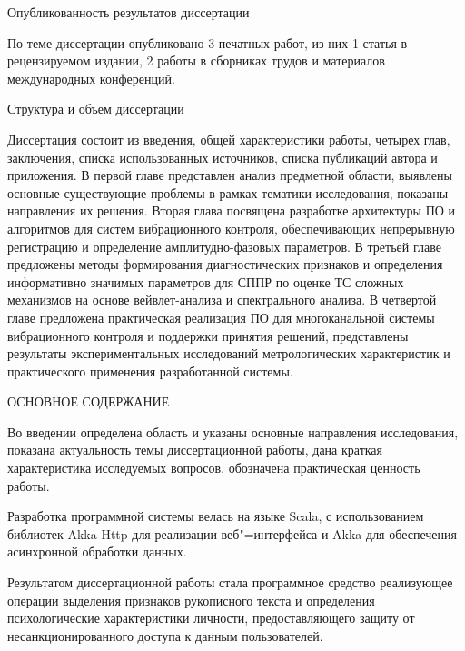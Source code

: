 



Опубликованность результатов диссертации

По теме диссертации опубликовано 3 печатных работ, из них 1 статья в рецензируемом издании, 2 работы в сборниках трудов и материалов международных конференций.

Структура и объем диссертации

Диссертация состоит из введения, общей характеристики работы, четырех глав, заключения, списка использованных источников, списка публикаций автора и приложения. В первой главе представлен анализ предметной области, выявлены основные существующие проблемы в рамках тематики исследования, показаны направления их решения. Вторая глава посвящена разработке архитектуры ПО и алгоритмов для систем вибрационного контроля, обеспечивающих непрерывную регистрацию и определение амплитудно-фазовых параметров. В третьей главе предложены методы формирования диагностических признаков и определения информативно значимых параметров для СППР по оценке ТС сложных механизмов на основе вейвлет-анализа и спектрального анализа. В четвертой главе предложена практическая реализация ПО для многоканальной системы вибрационного контроля и поддержки принятия решений, представлены результаты экспериментальных исследований метрологических характеристик и практического применения разработанной системы.


ОСНОВНОЕ СОДЕРЖАНИЕ

Во введении определена область и указаны основные направления исследования, показана актуальность темы диссертационной работы, дана краткая характеристика исследуемых вопросов, обозначена практическая ценность     работы.

Разработка программной системы велась на языке Scala, с использованием библиотек Akka-Http для реализации веб"=интерфейса и Akka для обеспечения асинхронной обработки данных. 

Результатом диссертационной работы стала программное средство реализующее операции выделения признаков рукописного текста и определения психологические характеристики личности, предоставляющего защиту от несанкционированного доступа к данным пользователей.

\clearpage